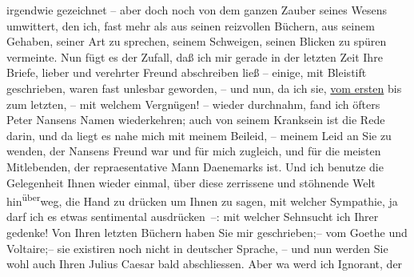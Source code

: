 \begin{ledgroupsized}[t]{13cm}
               irgendwie gezeichnet – aber doch noch von dem ganzen Zauber seines Wesens umwittert,
               den ich, fast mehr als aus seinen reizvollen Büchern, aus seinem Gehaben, seiner Art
               zu sprechen, seinem Schweigen, seinen Blicken zu spüren vermeinte. Nun fügt es der
               Zufall, daß ich mir gerade in der letzten Zeit Ihre Briefe, lieber und verehrter
               Freund abschreiben ließ – einige, mit Bleistift geschrieben, waren fast unlesbar
               geworden, – und nun, da ich sie, \uline{vom ersten} bis zum
               letzten,  – mit welchem Vergnügen! – wieder
               durchnahm, fand ich öfters Peter Nansens Namen
               wiederkehren; auch von seinem Kranksein ist die Rede darin, und da liegt es nahe mich
               mit meinem Beileid, – meinem Leid an Sie zu wenden, der Nansens Freund war und für mich zugleich, und für die meisten
               Mitlebenden, {\pb}der repraesentative Mann Daenemarks ist. Und ich benutze die Gelegenheit
               Ihnen wieder einmal, über diese zerrissene und stöhnende Welt hin\substVorne{}\textsuperscript{über}\substDazwischen{}weg\substHinten{}, die Hand zu drücken um Ihnen zu sagen, mit welcher Sympathie, ja darf ich
               es etwas sentimental ausdrücken –: mit welcher Sehnsucht ich Ihrer gedenke! Von Ihren
               letzten Büchern haben Sie mir geschrieben;– vom Goethe und Voltaire;– sie existiren noch nicht in deutscher Sprache, – und nun werden Sie wohl auch
               Ihren Julius Caesar bald abschliessen. Aber wa{\geminationn} werd ich Ignorant, der

\end{ledgroupsized}
